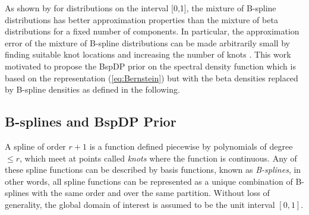 \documentclass[twocolumn,final]{svjour3}
\newcommand{\pmr}{ \color{red}}
\begin{document}
As shown by \cite{Perron:2001} for distributions on the interval [0,1], the mixture of B-spline distributions has better approximation properties than the mixture of beta distributions for a fixed number of components. In particular, the approximation error of the mixture of B-spline distributions can be made arbitrarily small by finding  suitable knot locations and increasing the number of knots {\pmr\citep{Perron:2001}}.
This work motivated \cite{Edwards2019} to propose the BspDP prior on the spectral density function which is based on the representation (\ref{eq:Bernstein}) but with
the beta densities replaced by B-spline densities as defined in the following.

\subsection*{B-splines and BspDP Prior}

A spline of {\pmr order} $r+1$ is a function defined piecewise by polynomials of degree $\leq r$, which meet at points called \textit{knots} where the function is continuous.  Any of these spline functions can be described by basis functions, known as \textit{B-splines}, in other words, all spline functions can be represented as a unique combination of B-splines with the same order and over the same partition.  Without loss of generality, the global domain of interest is assumed to be the unit interval $[0,1]$.
\end{document}
